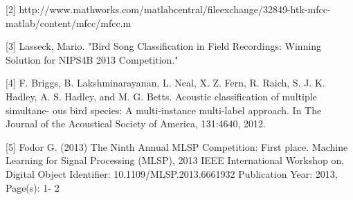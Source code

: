 [2] http://www.mathworks.com/matlabcentral/fileexchange/32849-htk-mfcc-matlab/content/mfcc/mfcc.m

[3] Lasseck, Mario. "Bird Song Classification in Field Recordings: Winning Solution for NIPS4B 2013 Competition."

[4] F. Briggs, B. Lakshminarayanan, L. Neal, X. Z. Fern,
R. Raich, S. J. K. Hadley, A. S. Hadley, and M. G.
Betts. Acoustic classification of multiple simultane-
ous bird species: A multi-instance multi-label approach.
In The Journal of the Acoustical Society of America,
131:4640, 2012.

[5] Fodor G. (2013) The Ninth Annual MLSP Competition: First place. Machine Learning for Signal
Processing (MLSP), 2013 IEEE International Workshop on, Digital Object Identifier:
10.1109/MLSP.2013.6661932 Publication Year: 2013, Page(s): 1- 2

